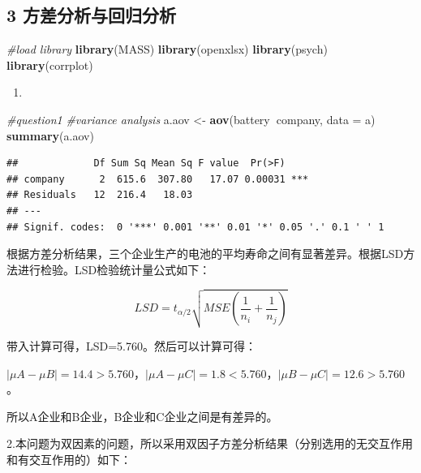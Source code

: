 \documentclass[]{ctexbook}
\newenvironment{Shaded}{\begin{snugshade}}{\end{snugshade}}
\newcommand{\CommentTok}[1]{\textcolor[rgb]{0.56,0.35,0.01}{\textit{#1}}}
\newcommand{\DataTypeTok}[1]{\textcolor[rgb]{0.13,0.29,0.53}{#1}}
\newcommand{\KeywordTok}[1]{\textcolor[rgb]{0.13,0.29,0.53}{\textbf{#1}}}
\newcommand{\NormalTok}[1]{#1}
\newcommand{\OperatorTok}[1]{\textcolor[rgb]{0.81,0.36,0.00}{\textbf{#1}}}
\newcommand{\StringTok}[1]{\textcolor[rgb]{0.31,0.60,0.02}{#1}}
\begin{document}
\hypertarget{ux65b9ux5deeux5206ux6790ux4e0eux56deux5f52ux5206ux6790-1}{%
\subsection{3 方差分析与回归分析}\label{ux65b9ux5deeux5206ux6790ux4e0eux56deux5f52ux5206ux6790-1}}

\begin{Shaded}
\begin{Highlighting}[]
\CommentTok{#load library}
\KeywordTok{library}\NormalTok{(MASS)}
\KeywordTok{library}\NormalTok{(openxlsx)}
\KeywordTok{library}\NormalTok{(psych)}
\KeywordTok{library}\NormalTok{(corrplot)}
\end{Highlighting}
\end{Shaded}

\begin{enumerate}
\def\labelenumi{\arabic{enumi}.}
\item
\end{enumerate}

\begin{Shaded}
\begin{Highlighting}[]
\CommentTok{#question1}
\CommentTok{#variance analysis}
\NormalTok{a.aov <-}\StringTok{ }\KeywordTok{aov}\NormalTok{(battery}\OperatorTok{~}\NormalTok{company, }\DataTypeTok{data =}\NormalTok{ a)}
\KeywordTok{summary}\NormalTok{(a.aov)}
\end{Highlighting}
\end{Shaded}

\begin{verbatim}
##             Df Sum Sq Mean Sq F value  Pr(>F)    
## company      2  615.6  307.80   17.07 0.00031 ***
## Residuals   12  216.4   18.03                    
## ---
## Signif. codes:  0 '***' 0.001 '**' 0.01 '*' 0.05 '.' 0.1 ' ' 1
\end{verbatim}

根据方差分析结果，三个企业生产的电池的平均寿命之间有显著差异。根据LSD方法进行检验。LSD检验统计量公式如下：

\[LSD=t_{\alpha/2}\sqrt{MSE(\frac{1}{n_i}+\frac{1}{n_j})}\]

带入计算可得，LSD=5.760。然后可以计算可得：

\(|\mu A-\mu B|=14.4>5.760\)，\(|\mu A-\mu C|=1.8<5.760\)，\(|\mu B-\mu C|=12.6>5.760\)。

所以A企业和B企业，B企业和C企业之间是有差异的。

2.本问题为双因素的问题，所以采用双因子方差分析结果（分别选用的无交互作用和有交互作用的）如下：
\end{document}
